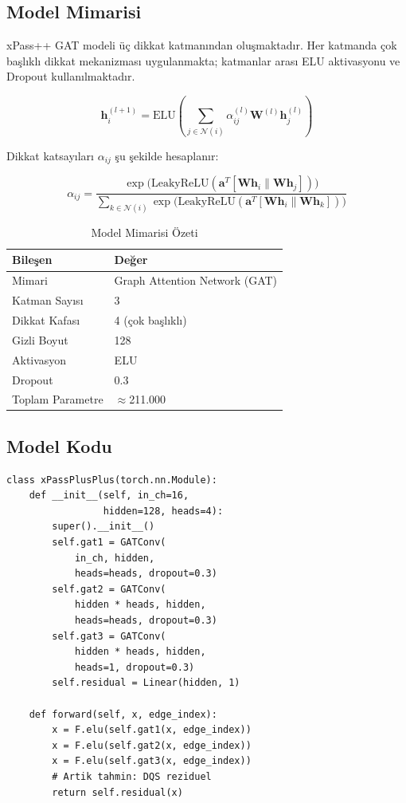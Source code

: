 \documentclass[conference]{IEEEtran}
\begin{document}
\subsection{Model Mimarisi}

xPass++ GAT modeli üç dikkat katmanından oluşmaktadır. Her katmanda çok başlıklı
dikkat mekanizması uygulanmakta; katmanlar arası ELU aktivasyonu ve Dropout
kullanılmaktadır.

\begin{equation}
  \mathbf{h}_i^{(l+1)} = \text{ELU}\!\left(\sum_{j \in \mathcal{N}(i)} \alpha_{ij}^{(l)} \mathbf{W}^{(l)} \mathbf{h}_j^{(l)}\right)
\end{equation}

Dikkat katsayıları $\alpha_{ij}$ şu şekilde hesaplanır:

\begin{equation}
  \alpha_{ij} = \frac{\exp\!\bigl(\text{LeakyReLU}(\mathbf{a}^T [\mathbf{W}\mathbf{h}_i \| \mathbf{W}\mathbf{h}_j])\bigr)}{\sum_{k \in \mathcal{N}(i)} \exp\!\bigl(\text{LeakyReLU}(\mathbf{a}^T [\mathbf{W}\mathbf{h}_i \| \mathbf{W}\mathbf{h}_k])\bigr)}
\end{equation}

\begin{table}[H]
  \centering
  \caption{Model Mimarisi Özeti}
  \label{tab:arch}
  \begin{tabular}{ll}
    \toprule
    \textbf{Bileşen} & \textbf{Değer} \\
    \midrule
    Mimari & Graph Attention Network (GAT) \\
    Katman Sayısı & 3 \\
    Dikkat Kafası & 4 (çok başlıklı) \\
    Gizli Boyut & 128 \\
    Aktivasyon & ELU \\
    Dropout & 0.3 \\
    Toplam Parametre & $\approx$211.000 \\
    \bottomrule
  \end{tabular}
\end{table}

\subsection{Model Kodu}

\begin{lstlisting}[caption={xPass++ GAT Mimarisi (PyTorch Geometric)}]
class xPassPlusPlus(torch.nn.Module):
    def __init__(self, in_ch=16,
                 hidden=128, heads=4):
        super().__init__()
        self.gat1 = GATConv(
            in_ch, hidden,
            heads=heads, dropout=0.3)
        self.gat2 = GATConv(
            hidden * heads, hidden,
            heads=heads, dropout=0.3)
        self.gat3 = GATConv(
            hidden * heads, hidden,
            heads=1, dropout=0.3)
        self.residual = Linear(hidden, 1)

    def forward(self, x, edge_index):
        x = F.elu(self.gat1(x, edge_index))
        x = F.elu(self.gat2(x, edge_index))
        x = F.elu(self.gat3(x, edge_index))
        # Artik tahmin: DQS reziduel
        return self.residual(x)
\end{lstlisting}
\end{document}
